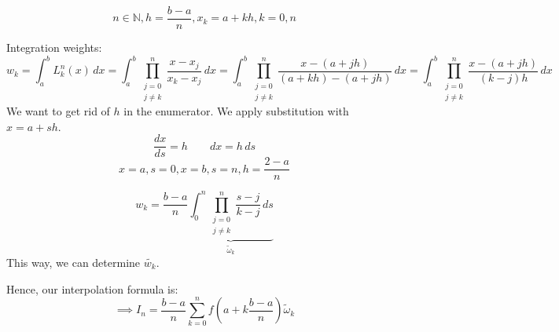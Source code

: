 \documentclass{article}
\begin{document}
\[ n \in \mathbb N, h = \frac{b-a}{n}, x_k = a + kh, k = 0,n \]

Integration weights:
\[ w_k = \int_a^b L_k^n(x) \, dx = \int_a^b \prod_{\substack{j = 0 \\ j \neq k}}^n \frac{x - x_j}{x_k - x_j} \, dx = \int_a^b \prod_{\substack{j=0 \\ j \neq k}}^n \frac{x - (a + jh)}{(a + kh) - (a + jh)} \, dx = \int_a^b \prod_{\substack{j=0 \\ j \neq k}}^n \frac{x - (a + jh)}{(k-j)h} \, dx \]
We want to get rid of $h$ in the enumerator. We apply substitution with $x = a + sh$.
\[ \frac{dx}{ds} = h \qquad dx = h \, ds \]
\[ x=a, s=0, x=b, s=n, h=\frac{2 - a}{n} \]

\[ w_k = \frac{b-a}{n} \underbrace{\int_0^n \prod_{\substack{j=0 \\ j \neq k}}^n \frac{s-j}{k-j} \, ds}_{\tilde \omega_k} \]
This way, we can determine $\tilde{w_k}$.

Hence, our interpolation formula is:
\[ \implies I_n = \frac{b-a}{n} \sum_{k=0}^n f\left(a + k \frac{b-a}{n}\right) \tilde \omega_k \]
\end{document}
